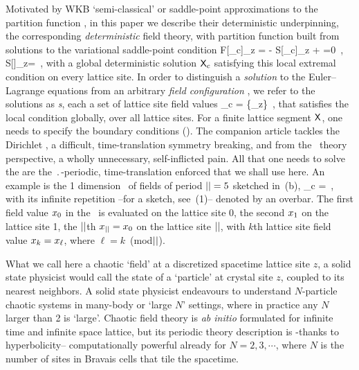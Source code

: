 Motivated by WKB `semi-classical' or saddle-point
approximations to the partition function ,
in this paper we describe their deterministic underpinning, the corresponding
\emph{deterministic} field theory, with partition function built from
solutions to the variational saddle-point condition
\beq
F[\Xx_c]_z =
- S[\Xx_c]_z +  =0
\,,\qquad
S[\Xx]_z=
\,,
with a global deterministic solution $\mathsf{X}_c$ satisfying this local extremal
condition on every lattice site.
In order to distinguish a \emph{solution} to the Euler–Lagrange equations
 from an {arbitrary} \emph{field configuration}
, we refer to the solutions as
\emph{{\lattstate}s}, each a set of lattice site field values
\beq
\Xx_c = \{\ssp_z\}
\,,
\label{1dLattStat}
\eeq
that satisfies the local {condition}  globally,
over all lattice sites.
For a finite lattice segment $\mathsf{X}$, one needs to specify the boundary
conditions ({\bcs}).
The companion article  tackles the Dirichlet {\bcs}, a
difficult, time-translation symmetry breaking, and from the \po\ theory
perspective, a wholly unnecessary, self-inflicted pain. All that one
needs to solve the {\templatt} are the $\period{}$-periodic,
time-translation enforced {\bcs} that we shall use here.
An example is the 1 {\spt} dimension \brick\ of fields of period
${||}=5$ sketched in \,(b),
\beq
\Xx_c = 
\,,
with its infinite repetition --for a sketch, see
\,(1)-- denoted by an overbar.
The first field value $x_0$ in the \brick\ is evaluated on the lattice site 0,
the second $x_1$ on the lattice site 1,
the ${||}$th $x_{{||}}=x_0$ on the lattice site ${||}$,
with $k$th lattice site field value $x_{k}=x_{\ell}$,
where $\ell=k$~(mod${||}$).

What we call here a chaotic `field' at a discretized spacetime lattice
site $z$, a solid state physicist would call the state of a `particle' at
crystal site $z$, coupled to its nearest neighbors. A solid state
physicist endeavours to understand $N$-particle chaotic systems in
many-body or `large $N$' settings, where in practice any $N$ larger than 2
is `large'. Chaotic field theory is {\em ab initio} formulated for infinite
time and infinite space lattice, but its periodic theory description is
-thanks to hyperbolicity-- computationally powerful already for $N=2, 3,
\cdots$, where $N$ is the number of sites in Bravais cells that tile the
spacetime.

